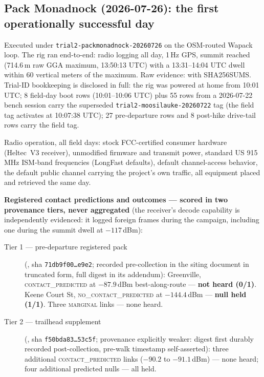 \documentclass[11pt]{article}
\newcommand{\code}[1]{\texttt{\small #1}}
\begin{document}
\subsection{Pack Monadnock (2026-07-26): the first operationally successful day}\label{sec:packday}

Executed under \code{trial2-packmonadnock-20260726} on the OSM-routed Wapack
loop. The rig ran end-to-end: radio logging all day, 1\,Hz GPS, summit reached (714.6\,m raw GGA maximum, 13:50:13 UTC) with a 13:31--14:04 UTC dwell
within 60 vertical meters of the maximum. Raw evidence:
 with SHA256SUMS. Trial-ID bookkeeping is disclosed in full: the rig was powered at home from 10:01 UTC; 8 field-day boot rows (10:01--10:06 UTC) plus 55 rows from a 2026-07-22 bench session carry the superseded \code{trial2-moosilauke-20260722} tag (the field tag activates at 10:07:38 UTC); 27 pre-departure rows and 8 post-hike drive-tail rows carry the field tag.

Radio operation, all field days: stock FCC-certified consumer hardware
(Heltec~V3 receiver), unmodified firmware and transmit power, standard US
915\,MHz ISM-band frequencies (LongFast defaults), default channel-access
behavior, the default public channel carrying the project's own traffic, all
equipment placed and retrieved the same day.

\textbf{Registered contact predictions and outcomes --- scored in two
provenance tiers, never aggregated} (the receiver's decode capability is
independently evidenced: it logged foreign frames during the campaign,
including one during the summit dwell at $-117$\,dBm):

\begin{description}
\item[Tier 1 --- pre-departure registered pack]
(, sha
\code{71db9f00\ldots e9e2}; recorded pre-collection in the siting document in
truncated form, full digest in its addendum): Greenville,
\textsc{contact\_predicted} at $-87.9$\,dBm best-along-route --- \textbf{not
heard (0/1)}. Keene Court St, \textsc{no\_contact\_predicted} at
$-144.4$\,dBm --- \textbf{null held (1/1)}. Three \textsc{marginal} links ---
none heard.
\item[Tier 2 --- trailhead supplement]
(, sha
\code{f50bda83\ldots 53c5f}; provenance explicitly weaker: digest first
durably recorded post-collection, pre-walk timestamp self-asserted): three
additional \textsc{contact\_predicted} links ($-90.2$ to $-91.1$\,dBm) ---
none heard; four
additional predicted nulls --- all held.
\end{description}
\end{document}
